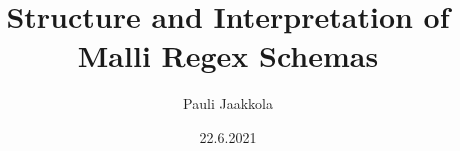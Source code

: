 \documentclass{beamer}
\title{Structure and Interpretation of Malli Regex Schemas}
\author{Pauli Jaakkola}
\date{22.6.2021}
\begin{document}
\frame{\titlepage}
\end{document}
